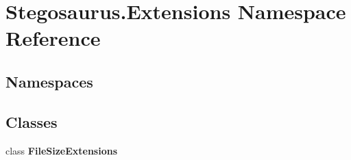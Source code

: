 \hypertarget{namespace_stegosaurus_1_1_extensions}{}\section{Stegosaurus.\+Extensions Namespace Reference}
\label{namespace_stegosaurus_1_1_extensions}
\subsection*{Namespaces}
\begin{DoxyCompactItemize}
\end{DoxyCompactItemize}
\subsection*{Classes}
\begin{DoxyCompactItemize}
\item 
class {\bfseries File\+Size\+Extensions}
\end{DoxyCompactItemize}
